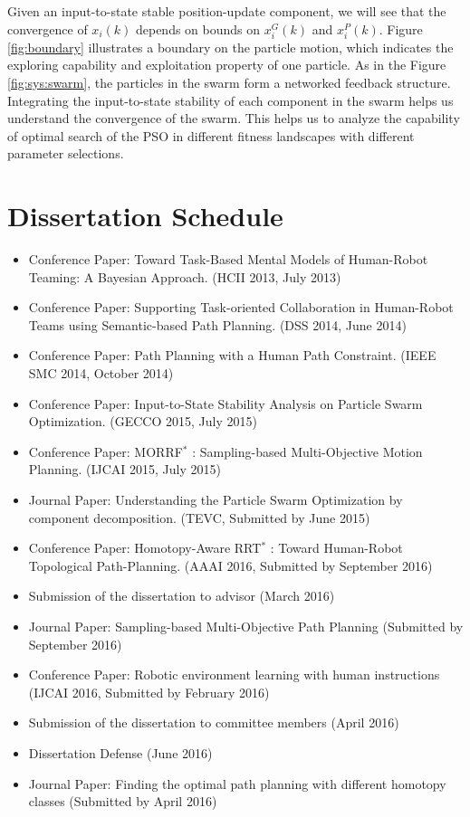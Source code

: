 \documentclass[phd]{byuprop}
\begin{document}
Given an input-to-state stable position-update component, we will see that the convergence of $ x_{i}(k) $ depends on bounds on $ x^{G}_{i}(k) $ and $ x^{P}_{i}(k) $.
Figure \ref{fig:boundary} illustrates a boundary on the particle motion, which indicates the exploring capability and exploitation property of one particle.
As in the Figure \ref{fig:sys:swarm}, the particles in the swarm form a networked feedback structure.
Integrating the input-to-state stability of each component in the swarm helps us understand the convergence of the swarm.
This helps us to analyze the capability of optimal search of the PSO in different fitness landscapes with different parameter selections.


\section{Dissertation Schedule}

\begin{itemize}
\item Conference Paper: Toward Task-Based Mental Models of Human-Robot Teaming: A Bayesian Approach. (HCII 2013, July 2013)
\item Conference Paper: Supporting Task-oriented Collaboration in Human-Robot Teams using Semantic-based Path Planning. (DSS 2014, June 2014)
\item Conference Paper: Path Planning with a Human
Path Constraint. (IEEE SMC 2014, October 2014)
\item Conference Paper: Input-to-State Stability Analysis on Particle Swarm Optimization. (GECCO 2015, July 2015)
\item Conference Paper: MORRF$^{*}$ : Sampling-based Multi-Objective Motion Planning. (IJCAI 2015, July 2015)
\item Journal Paper: Understanding the Particle Swarm Optimization by component decomposition. (TEVC, Submitted by June 2015)
\item Conference Paper: Homotopy-Aware RRT$^{*}$ : Toward Human-Robot Topological Path-Planning. (AAAI 2016, Submitted by September 2016)
\item Submission of the dissertation to advisor (March 2016)
\item Journal Paper: Sampling-based Multi-Objective Path Planning (Submitted by September 2016)
\item Conference Paper: Robotic environment learning with human instructions (IJCAI 2016, Submitted by February 2016)
\item Submission of the dissertation to committee members (April 2016)
\item Dissertation Defense (June 2016)
\item Journal Paper: Finding the optimal path planning with different homotopy classes (Submitted by April 2016)
\end{itemize}



\end{document}

